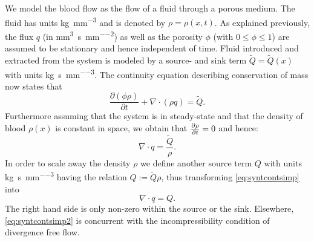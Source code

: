 \documentclass[paper=a4, fontsize=11pt,parskip=half,headings=small]{scrartcl}
\newcommand{\siq}{\cubic\milli\meter\per\second\per\square\milli\meter}
\newcommand{\siQ}{\kilo\gram\per\second\per\cubic\milli\meter}
\newcommand{\sirho}{\kilo\gram\per\cubic\milli\meter}
\begin{document}
	We model the blood flow as the flow of a fluid through a porous medium. 
	The fluid has units \si{\sirho} and is denoted by $\rho = \rho(x,t)$.
	As explained previously, the flux $q$ (in \si{\siq}) as well as the porosity $\phi$ (with $0 \le \phi \le 1$) are assumed to be stationary and hence independent of time.
	Fluid introduced and extracted from the system is modeled by a source- and sink term $\tilde{Q} = \tilde{Q}(x)$ with units \si{\siQ}. 
	The continuity equation describing conservation of mass now states that
	\begin{equation}
		\frac{\partial (\phi \rho)}{\partial t} + \nabla \cdot (\rho q) = \tilde{Q}.
		\label{eq:syntcont}
	\end{equation} 
	Furthermore assuming that the system is in steady-state and that the density of blood $\rho(x)$ is constant in space, we obtain that $\frac{\partial \rho}{\partial t} = 0$ and hence:
	\begin{equation}
		\nabla \cdot q = \frac{\tilde{Q}}{\rho}.
		\label{eq:syntcontsimp}
	\end{equation}
	In order to scale away the density $\rho$ we define another source term $Q$ with units \si{\siQ} having the relation $Q := \tilde{Q}\rho$, thus transforming \eqref{eq:syntcontsimp} into
	\begin{equation}
		\nabla \cdot q = Q.
		\label{eq:syntcontsimp2}
	\end{equation}
	The right hand side is only non-zero within the source or the sink. 
	Elsewhere, \eqref{eq:syntcontsimp2} is concurrent with the incompressibility condition of divergence free flow.
	
\end{document}
